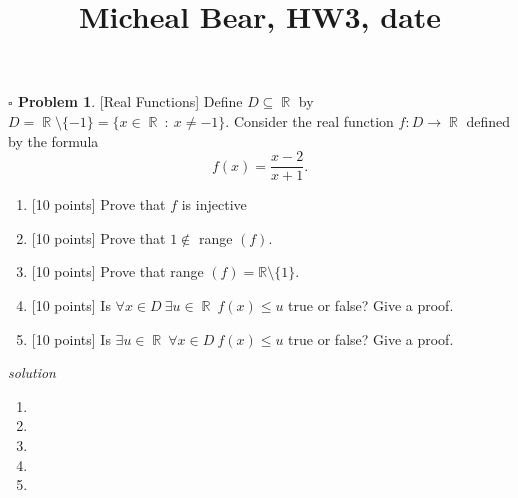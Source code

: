 \documentclass[11pt,twoside]{amsart}
\title {Micheal Bear, HW3, date}
\DeclareMathOperator*{\R}{\mathbb{R}} \DeclareMathOperator*{\N}{\mathbb{N}} \DeclareMathOperator*{\Q}{\mathbb{Q}} \DeclareMathOperator*{\Z}{\mathbb{Z}} \DeclareMathOperator*{\E}{\mathbb{E}} \DeclareMathOperator*{\C}{\mathbb{C}} \DeclareMathOperator*{\A}{\mathbb{A}}
\theoremstyle{definition}
\newtheorem{bprob}{$\square$ Problem}
\begin{document}
	\maketitle	
  
 \begin{bprob}
  [\textsf{Real Functions}] Define $D \subseteq \R$ by $D = \R \setminus \{-1\} = \{ x \in \R \ : \ x \neq -1 \}.$ Consider the real function $f: D \rightarrow \R$ defined by the formula $$f(x) = \frac{x-2}{x+    1}.$$

  \begin{enumerate}[label= 1.\arabic*, itemsep=0.2cm]
    \item {[10 points]} Prove that $f$ is injective 
    \item {[10 points]} Prove that $1 \not \in$ range $(f)$.
    \item {[10 points]} Prove that range $(f) = \mathbb{R} \setminus \{1\}$.
    \item {[10 points]} Is $\forall x \in D \ \exists u \in \R \ f(x) \leq u$ true or false? Give a proof.
    \item {[10 points]} Is $\exists u \in \R \ \forall x \in D \ f(x) \leq u$ true or false? Give a proof.
 \end{enumerate} 
\end{bprob}

\emph{solution}
\begin{enumerate}[label= 1.\arabic*), itemsep=0.4cm]
  \item %
  

  \item %
    

  \item %


  \item %



  \item %


\end{enumerate}

\newpage
    
\end{document}
